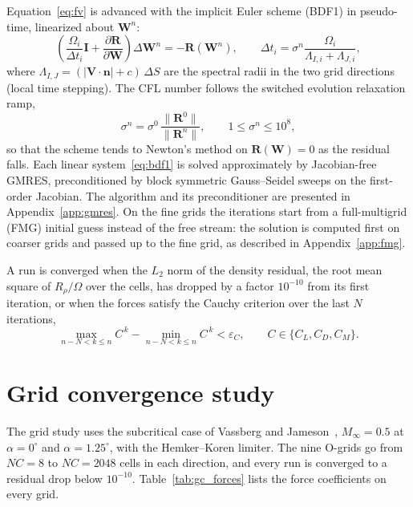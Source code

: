 \documentclass[12pt,a4paper]{article}
\begin{document}
Equation~\eqref{eq:fv} is advanced with the implicit Euler scheme (BDF1) in pseudo-time,
linearized about $\mathbf{W}^n$:
\begin{equation}
  \left(\frac{\Omega_i}{\Delta t_i}\mathbf{I}+\frac{\partial\mathbf{R}}{\partial\mathbf{W}}\right)\Delta\mathbf{W}^n
  = -\mathbf{R}(\mathbf{W}^n),
  \qquad
  \Delta t_i=\sigma^n\frac{\Omega_i}{\Lambda_{I,i}+\Lambda_{J,i}},
  \label{eq:bdf1}
\end{equation}
where $\Lambda_{I,J}=(|\mathbf{V}\cdot\mathbf{n}|+c)\,\Delta S$ are the spectral radii in the two
grid directions (local time stepping). The CFL number follows the switched evolution relaxation
ramp,
\begin{equation}
  \sigma^n=\sigma^0\,\frac{\|\mathbf{R}^0\|}{\|\mathbf{R}^n\|},
  \qquad 1\le\sigma^n\le10^8,
  \label{eq:ser}
\end{equation}
so that the scheme tends to Newton's method on $\mathbf{R}(\mathbf{W})=0$ as the residual falls.
Each linear system~\eqref{eq:bdf1} is solved approximately by Jacobian-free GMRES, preconditioned
by block symmetric Gauss--Seidel sweeps on the first-order Jacobian. The algorithm and its preconditioner
are presented in Appendix~\ref{app:gmres}. On the fine grids the iterations start from a
full-multigrid (FMG) initial guess instead of the free stream: the solution is computed first on
coarser grids and passed up to the fine grid, as described in Appendix~\ref{app:fmg}.

A run is converged when the $L_2$ norm of the density residual, the root mean square of
$R_\rho/\Omega$ over the cells, has dropped by a factor $10^{-10}$ from its first iteration, or
when the forces satisfy the Cauchy criterion over the last $N$ iterations,
\begin{equation}
  \max_{n-N<k\le n}C^{\,k}-\min_{n-N<k\le n}C^{\,k}<\varepsilon_C,
  \qquad C\in\{C_L,C_D,C_M\}.
  \label{eq:cauchy}
\end{equation}

\section{Grid convergence study}

The grid study uses the subcritical case of Vassberg and Jameson~\cite{vj2010}, $M_\infty=0.5$ at
$\alpha=0^\circ$ and $\alpha=1.25^\circ$, with the Hemker--Koren limiter. The nine O-grids go from
$NC=8$ to $NC=2048$ cells in each direction, and every run is converged to a residual drop below
$10^{-10}$. Table~\ref{tab:gc_forces} lists the force coefficients on every grid.
\end{document}
